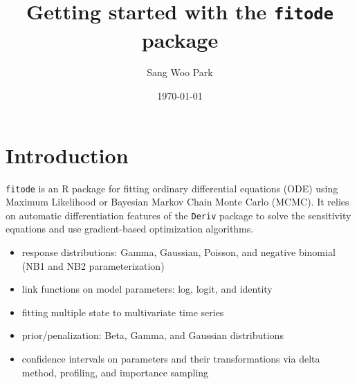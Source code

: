 \documentclass{article}\usepackage[]{graphicx}\usepackage[]{color}
\title{Getting started with the \texttt{fitode} package}
\author{Sang Woo Park}
\date{\today}
\begin{document}
\maketitle



\tableofcontents

\pagebreak

\section{Introduction}

\texttt{fitode} is an R package for fitting ordinary differential equations (ODE)
using Maximum Likelihood or Bayesian Markov Chain Monte Carlo (MCMC). It relies on
automatic differentiation features of the \texttt{Deriv} package to solve the
sensitivity equations and use gradient-based optimization algorithms.
\begin{itemize}
    \item response distributions: Gamma, Gaussian, Poisson, and negative
            binomial (NB1 and NB2 parameterization)
    \item link functions on model parameters: log, logit, and identity
    \item fitting multiple state to multivariate time series
    \item prior/penalization: Beta, Gamma, and Gaussian distributions
    \item confidence intervals on parameters and their transformations via
            delta method, profiling, and importance sampling
\end{itemize}
\end{document}

